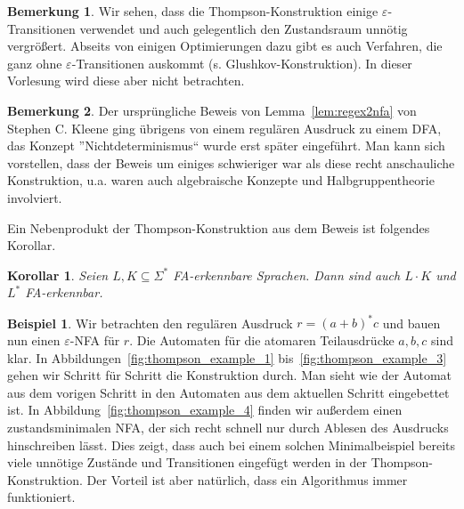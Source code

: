 \documentclass[11pt, a4paper]{article}
\theoremstyle{definition}
\newtheorem{example}[definition]{Beispiel}
\newtheorem*{remark*}{Bemerkung}
\theoremstyle{plain}
\newtheorem{corollary}[definition]{Korollar}
\numberwithin{equation}{section}
\begin{document}
\begin{remark*}
	Wir sehen, dass die Thompson-Konstruktion einige \(\varepsilon\)-Tran\-si\-tio\-nen verwendet und auch gelegentlich den Zustandsraum unnötig vergrößert. Abseits von einigen Optimierungen dazu gibt es auch Verfahren, die ganz ohne \(\varepsilon\)-Transitionen auskommt (s. Glushkov-Konstruktion). In dieser Vorlesung wird diese aber nicht betrachten.
\end{remark*}
\begin{remark*}
	Der ursprüngliche Beweis von Lemma~\ref{lem:regex2nfa} von Stephen {C.} Kleene ging übrigens von einem regulären Ausdruck zu einem DFA, das Konzept ''Nichtdeterminismus`` wurde erst später eingeführt. Man kann sich vorstellen, dass der Beweis um einiges schwieriger war als diese recht anschauliche Konstruktion, u.a. waren auch algebraische Konzepte und Halbgruppentheorie involviert.
\end{remark*}
Ein Nebenprodukt der Thompson-Konstruktion aus dem Beweis ist folgendes Korollar.
\begin{corollary}
	Seien \( L, K \subseteq \Sigma^\ast \) FA-erkennbare Sprachen. Dann sind auch \( L \cdot K \) und \( L^\ast \) FA-erkennbar.
\end{corollary}
\begin{example}
	Wir betrachten den regulären Ausdruck \( r = (a+b)^\ast c \) und bauen nun einen \(\varepsilon\)-NFA für \( r \). Die Automaten für die atomaren Teilausdrücke \( a, b, c \) sind klar. In Abbildungen~\ref{fig:thompson_example_1} bis~\ref{fig:thompson_example_3} gehen wir Schritt für Schritt die Konstruktion durch. Man sieht wie der Automat aus dem vorigen Schritt in den Automaten aus dem aktuellen Schritt eingebettet ist. In Abbildung~\ref{fig:thompson_example_4} finden wir außerdem einen zustandsminimalen NFA, der sich recht schnell nur durch Ablesen des Ausdrucks hinschreiben lässt. Dies zeigt, dass auch bei einem solchen Minimalbeispiel bereits viele unnötige Zustände und Transitionen eingefügt werden in der Thompson-Konstruktion. Der Vorteil ist aber natürlich, dass ein Algorithmus immer funktioniert.
\end{example}
\end{document}
